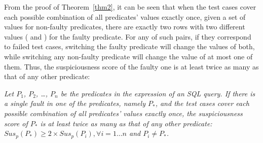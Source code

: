 From the proof of Theorem~\ref{thm2}, it can be seen that when the
test cases cover each possible combination of all predicates' values
exactly once, given a set of values for non-faulty predicates, there
are exactly two rows with two different values ( and
) for the faulty predicate. For any of such pairs, if they
correspond to failed test cases, switching the faulty predicate will
change the values of both, while switching any non-faulty predicate
will change the value of at most one of them. Thus, the
suspiciousness score of the faulty one is at least twice as many as
that of any other predicate:


\begin{corollary}
\label{cor}
{\em Let $P_1$, $P_2$, \ldots, $P_n$ be the predicates in the 
expression of an SQL query. If there is a single fault in one of the
predicates, namely $P_*$, and the test cases cover each possible
combination of all predicates' values exactly once, the suspiciousness
score of $P_*$ is at least twice as many as that of any other
predicate:\\ $Sus_p(P_*) \geq 2 \times Sus_p(P_i), \forall i = 1
\ldots n$ and $P_i \neq P_*$.}
\end{corollary}
